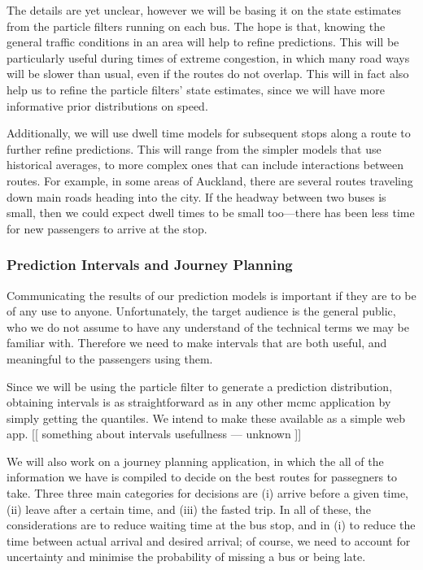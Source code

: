 \documentclass[12pt,a4paper]{article}
\begin{document}
The details are yet unclear, 
however we will be basing it on the state estimates from the particle filters running
on each bus.
The hope is that, knowing the general traffic conditions in an area
will help to refine predictions.
This will be particularly useful during times of extreme congestion,
in which many road ways will be slower than usual,
even if the routes do not overlap.
This will in fact also help us to refine the particle filters' state estimates,
since we will have more informative prior distributions on speed.


Additionally, we will use dwell time models for subsequent stops along a route 
to further refine predictions.
This will range from the simpler models that use historical averages,
to more complex ones that can include interactions between routes.
For example, in some areas of Auckland, 
there are several routes traveling down main roads heading into the city.
If the headway between two buses is small, 
then we could expect dwell times to be small too---there has been less time for
new passengers to arrive at the stop.




\subsubsection*{Prediction Intervals and Journey Planning}

Communicating the results of our prediction models is important if they are to be of any use to anyone.
Unfortunately, the target audience is the general public,
who we do not assume to have any understand of the technical terms we may be familiar with.
Therefore we need to make intervals that are both useful, 
and meaningful to the passengers using them.


Since we will be using the particle filter to generate a prediction distribution,
obtaining intervals is as straightforward as in any other \gls{mcmc} application
by simply getting the quantiles.
We intend to make these available as a simple web app.
[[ something about intervals usefullness --- unknown ]]


We will also work on a journey planning application,
in which the all of the information we have is compiled to decide on the best 
routes for passegners to take.
Three three main categories for decisions are 
(i) arrive before a given time, (ii) leave after a certain time, 
and (iii) the fasted trip.
In all of these, the considerations are to reduce waiting time at the bus stop,
and in (i) to reduce the time between actual arrival and desired arrival;
of course, we need to account for uncertainty and minimise the probability of missing a bus
or being late.
\end{document}

